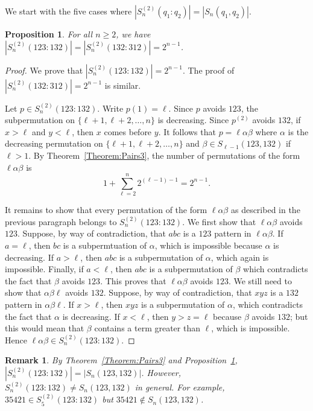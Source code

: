\documentclass[10pt,a4paper]{amsart}
\newtheorem{proposition}[theorem]{Proposition}
\newtheorem{remark}[theorem]{Remark}
\numberwithin{equation}{section}
\begin{document}
We start with the five cases where $|S_n^{(2)}(q_1:q_2)|=|S_n(q_1,q_2)|$.

\begin{proposition}\label{Prop:123;132}
For all $n\geq2$, we have $|S_n^{(2)}(123:132)|=|S_n^{(2)}(132:312)|=2^{n-1}$.
\end{proposition}
\begin{proof}
We prove that $|S_n^{(2)}(123:132)|=2^{n-1}$. The proof of $|S_n^{(2)}(132:312)|=2^{n-1}$ is similar.

Let $p\in S_n^{(2)}(123:132)$. Write $p(1)=\ell$. Since $p$ avoids $123$, the subpermutation on $\{\ell+1,\ell+2,\ldots,n\}$ is decreasing. Since $p^{(2)}$ avoids $132$, if $x>\ell$ and $y<\ell$, then $x$ comes before $y$. It follows that $p=\ell\alpha\beta$ where $\alpha$ is the decreasing permutation on $\{\ell+1,\ell+2,\ldots,n\}$ and $\beta\in S_{\ell-1}(123,132)$ if $\ell>1$. By Theorem~\ref{Theorem:Pairs3}, the number of permutations of the form $\ell\alpha\beta$ is
    \[
    1+\sum_{\ell=2}^n2^{(\ell-1)-1}=2^{n-1}.
    \]

It remains to show that every permutation of the form $\ell\alpha\beta$ as described in the previous paragraph belongs to $S_n^{(2)}(123:132)$. We first show that $\ell\alpha\beta$ avoids $123$. Suppose, by way of contradiction, that $abc$ is a $123$ pattern in $\ell\alpha\beta$. If $a=\ell$, then $bc$ is a subpermtuation of $\alpha$, which is impossible because $\alpha$ is decreasing. If $a>\ell$, then $abc$ is a subpermutation of $\alpha$, which again is impossible. Finally, if $a<\ell$, then $abc$ is a subpermutation of $\beta$ which contradicts the fact that $\beta$ avoids $123$. This proves that $\ell\alpha\beta$ avoids $123$. We still need to show that $\alpha\beta\ell$ avoids $132$. Suppose, by way of contradiction, that $xyz$ is a $132$ pattern in $\alpha\beta\ell$. If $x>\ell$, then $xyz$ is a subpermutation of $\alpha$, which contradicts the fact that $\alpha$ is decreasing. If $x<\ell$, then $y>z=\ell$ because $\beta$ avoids $132$; but this would mean that $\beta$ contains a term greater than $\ell$, which is impossible. Hence $\ell\alpha\beta\in S_n^{(2)}(123:132)$.
\end{proof}

\begin{remark}
By Theorem~\ref{Theorem:Pairs3} and Proposition~\ref{Prop:123;132}, $|S_n^{(2)}(123:132)|=|S_n(123,132)|$. However, $S_n^{(2)}(123:132)\neq S_n(123,132)$ in general. For example, $35421\in S_5^{(2)}(123:132)$ but $35421\notin S_n(123,132)$.
\end{remark}
\end{document}
